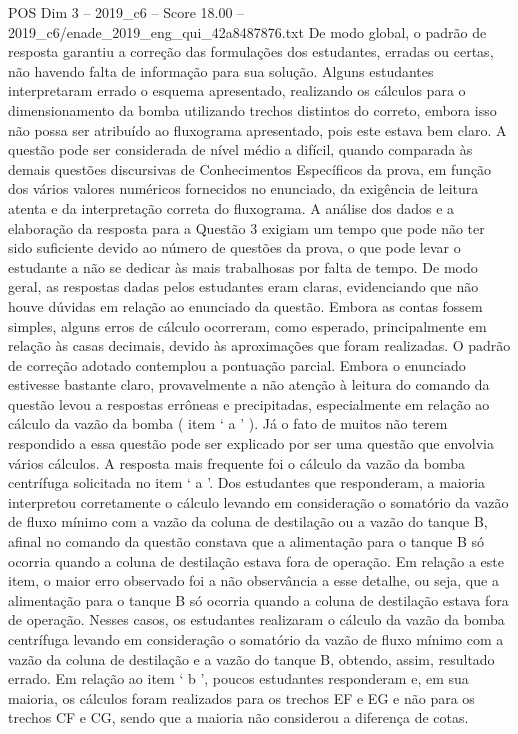 \begin{textsample}{POS Dim 3 – 2019\_c6 – Score 18.00 – 2019\_c6/enade\_2019\_eng\_qui\_42a8487876.txt}
De modo global, o padrão de resposta garantiu a correção das formulações dos estudantes, erradas ou certas, não havendo falta de informação para sua solução.
Alguns estudantes interpretaram errado o esquema apresentado, realizando os cálculos para o dimensionamento da bomba utilizando trechos distintos do correto, embora isso não possa ser atribuído ao fluxograma apresentado, pois este estava bem claro.
A questão pode ser considerada de nível médio a difícil, quando comparada às demais questões discursivas de Conhecimentos Específicos da prova, em função dos vários valores numéricos fornecidos no enunciado, da exigência de leitura atenta e da interpretação correta do fluxograma.
A análise dos dados e a elaboração da resposta para a Questão 3 exigiam um tempo que pode não ter sido suficiente devido ao número de questões da prova, o que pode levar o estudante a não se dedicar às mais trabalhosas por falta de tempo.
De modo geral, as respostas dadas pelos estudantes eram claras, evidenciando que não houve dúvidas em relação ao enunciado da questão.
Embora as contas fossem simples, alguns erros de cálculo ocorreram, como esperado, principalmente em relação às casas decimais, devido às aproximações que foram realizadas.
O padrão de correção adotado contemplou a pontuação parcial.
Embora o enunciado estivesse bastante claro, provavelmente a não atenção à leitura do comando da questão levou a respostas errôneas e precipitadas, especialmente em relação ao cálculo da vazão da bomba ( item ‘ a ’ ).
Já o fato de muitos não terem respondido a essa questão pode ser explicado por ser uma questão que envolvia vários cálculos.
A resposta mais frequente foi o cálculo da vazão da bomba centrífuga solicitada no item ‘ a ’.
Dos estudantes que responderam, a maioria interpretou corretamente o cálculo levando em consideração o somatório da vazão de fluxo mínimo com a vazão da coluna de destilação ou a vazão do tanque B, afinal no comando da questão constava que a alimentação para o tanque B só ocorria quando a coluna de destilação estava fora de operação.
Em relação a este item, o maior erro observado foi a não observância a esse detalhe, ou seja, que a alimentação para o tanque B só ocorria quando a coluna de destilação estava fora de operação.
Nesses casos, os estudantes realizaram o cálculo da vazão da bomba centrífuga levando em consideração o somatório da vazão de fluxo mínimo com a vazão da coluna de destilação e a vazão do tanque B, obtendo, assim, resultado errado.
Em relação ao item ‘ b ’, poucos estudantes responderam e, em sua maioria, os cálculos foram realizados para os trechos EF e EG e não para os trechos CF e CG, sendo que a maioria não considerou a diferença de cotas.

\end{textsample}
